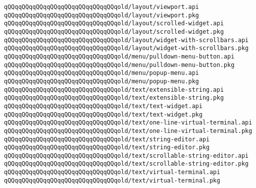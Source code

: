 \verb|qQQqqQQqqQQqqQQqqQQqqQQqqQQqqQQqold/layout/viewport.api|\newline
\verb|qQQqqQQqqQQqqQQqqQQqqQQqqQQqqQQqold/layout/viewport.pkg|\newline
\verb|qQQqqQQqqQQqqQQqqQQqqQQqqQQqqQQqold/layout/scrolled-widget.api|\newline
\verb|qQQqqQQqqQQqqQQqqQQqqQQqqQQqqQQqold/layout/scrolled-widget.pkg|\newline
\verb|qQQqqQQqqQQqqQQqqQQqqQQqqQQqqQQqold/layout/widget-with-scrollbars.api|\newline
\verb|qQQqqQQqqQQqqQQqqQQqqQQqqQQqqQQqold/layout/widget-with-scrollbars.pkg|\newline
\newline
\verb|qQQqqQQqqQQqqQQqqQQqqQQqqQQqqQQqold/menu/pulldown-menu-button.api|\newline
\verb|qQQqqQQqqQQqqQQqqQQqqQQqqQQqqQQqold/menu/pulldown-menu-button.pkg|\newline
\verb|qQQqqQQqqQQqqQQqqQQqqQQqqQQqqQQqold/menu/popup-menu.api|\newline
\verb|qQQqqQQqqQQqqQQqqQQqqQQqqQQqqQQqold/menu/popup-menu.pkg|\newline
\newline
\verb|qQQqqQQqqQQqqQQqqQQqqQQqqQQqqQQqold/text/extensible-string.api|\newline
\verb|qQQqqQQqqQQqqQQqqQQqqQQqqQQqqQQqold/text/extensible-string.pkg|\newline
\verb|qQQqqQQqqQQqqQQqqQQqqQQqqQQqqQQqold/text/text-widget.api|\newline
\verb|qQQqqQQqqQQqqQQqqQQqqQQqqQQqqQQqold/text/text-widget.pkg|\newline
\verb|qQQqqQQqqQQqqQQqqQQqqQQqqQQqqQQqold/text/one-line-virtual-terminal.api|\newline
\verb|qQQqqQQqqQQqqQQqqQQqqQQqqQQqqQQqold/text/one-line-virtual-terminal.pkg|\newline
\verb|qQQqqQQqqQQqqQQqqQQqqQQqqQQqqQQqold/text/string-editor.api|\newline
\verb|qQQqqQQqqQQqqQQqqQQqqQQqqQQqqQQqold/text/string-editor.pkg|\newline
\verb|qQQqqQQqqQQqqQQqqQQqqQQqqQQqqQQqold/text/scrollable-string-editor.api|\newline
\verb|qQQqqQQqqQQqqQQqqQQqqQQqqQQqqQQqold/text/scrollable-string-editor.pkg|\newline
\verb|qQQqqQQqqQQqqQQqqQQqqQQqqQQqqQQqold/text/virtual-terminal.api|\newline
\verb|qQQqqQQqqQQqqQQqqQQqqQQqqQQqqQQqold/text/virtual-terminal.pkg|\newline
